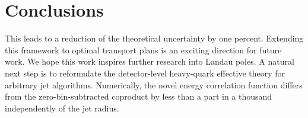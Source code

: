 \section{Conclusions}\label{sec:conclusions}

This leads to a reduction of the theoretical uncertainty by one percent.
Extending this framework to optimal transport plans is an exciting
direction for future work. We hope this work inspires further research
into Landau poles. A natural next step is to reformulate the
detector-level heavy-quark effective theory for arbitrary jet
algorithms. Numerically, the novel energy correlation function differs
from the zero-bin-subtracted coproduct by less than a part in a thousand
independently of the jet radius.

